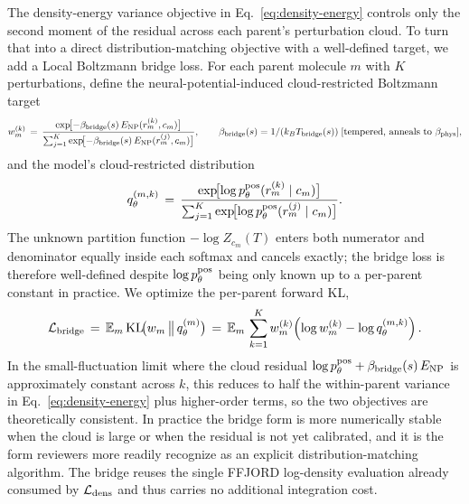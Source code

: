 \documentclass{article}
\begin{document}
The density-energy variance objective in Eq.~\eqref{eq:density-energy}
controls only the second moment of the residual across each parent's
perturbation cloud. To turn that into a direct distribution-matching
objective with a well-defined target, we add a Local Boltzmann bridge
loss. For each parent molecule $m$ with $K$ perturbations, define the
neural-potential-induced cloud-restricted Boltzmann target
\begin{equation}
    w_m^{(k)} \,=\, \frac{\exp\!\bigl[-\beta_{\rm bridge}(s)\, E_{\rm NP}(r_m^{(k)}, c_m)\bigr]}
                         {\sum_{j=1}^{K}\exp\!\bigl[-\beta_{\rm bridge}(s)\, E_{\rm NP}(r_m^{(j)}, c_m)\bigr]},
    \qquad \beta_{\rm bridge}(s)=1/(k_B T_{\rm bridge}(s))\;[\text{tempered, anneals to } \beta_{\rm phys}],
    \label{eq:bridge-target}
\end{equation}
and the model's cloud-restricted distribution
\begin{equation}
    q^{(m,k)}_\theta \,=\, \frac{\exp\!\bigl[\log p_\theta^{\rm pos}(r_m^{(k)}\mid c_m)\bigr]}
                                {\sum_{j=1}^{K}\exp\!\bigl[\log p_\theta^{\rm pos}(r_m^{(j)}\mid c_m)\bigr]}.
    \label{eq:bridge-model}
\end{equation}
The unknown partition function $-\log Z_{c_m}(T)$ enters both numerator
and denominator equally inside each softmax and cancels exactly; the
bridge loss is therefore well-defined despite $\log p_\theta^{\rm pos}$
being only known up to a per-parent constant in practice. We optimize
the per-parent forward KL,
\begin{equation}
    \mathcal L_{\rm bridge}
    \,=\, \mathbb E_m\,\mathrm{KL}\!\bigl(w_m \,\big\|\, q^{(m)}_\theta\bigr)
    \,=\, \mathbb E_m\,\sum_{k=1}^{K} w_m^{(k)}\!\left(\log w_m^{(k)} - \log q^{(m,k)}_\theta\right).
    \label{eq:bridge-loss}
\end{equation}
In the small-fluctuation limit where the cloud residual
$\log p_\theta^{\rm pos} + \beta_{\rm bridge}(s)\, E_{\rm NP}$ is
approximately constant across $k$, this reduces to half the within-parent
variance in
Eq.~\eqref{eq:density-energy} plus higher-order terms, so the two
objectives are theoretically consistent. In practice the bridge form is
more numerically stable when the cloud is large or when the residual is
not yet calibrated, and it is the form reviewers more readily recognize
as an explicit distribution-matching algorithm. The bridge reuses the
single FFJORD log-density evaluation already consumed by
$\mathcal L_{\rm dens}$ and thus carries no additional integration cost.
\end{document}
